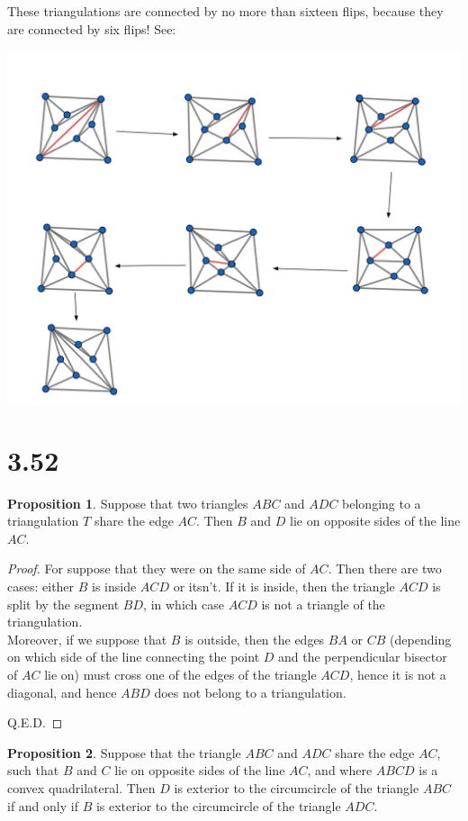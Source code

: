 \documentclass[12pt]{article}
\theoremstyle{definition}
\newtheorem{proposition}{Proposition}
\begin{document}
These triangulations are connected by no more than sixteen flips, because they are connected by six flips! See:

\includegraphics[scale=0.75]{flips.png} 


\section{3.52}


\begin{proposition}
Suppose that two triangles $ABC$ and $ADC$ belonging to a triangulation $T$ share the edge $AC$. Then $B$ and $D$ lie on opposite sides of the line $AC$. 
\end{proposition}

\begin{proof}
For suppose that they were on the same side of $AC$. Then there are two cases: either $B$ is inside $ACD$ or itsn't. If it is inside, then the triangle $ACD$ is split by the segment $BD$, in which case $ACD$ is not a triangle of the triangulation. \\

Moreover, if we suppose that $B$ is outside, then the edges $BA$ or $CB$ (depending on which side of the line connecting the point $D$ and the perpendicular bisector of $AC$ lie on) must cross one of the edges of the triangle $ACD$, hence it is not a diagonal, and hence $ABD$ does not belong to a triangulation.

Q.E.D.
\end{proof}

\begin{proposition}

Suppose that the triangle $ABC$ and $ADC$ share the edge $AC$, such that $B$ and $C$ lie on opposite sides of the line $AC$, and where $ABCD$ is a convex quadrilateral. Then $D$ is exterior to the circumcircle of the triangle $ABC$ if and only if $B$ is exterior to the circumcircle of the triangle $ADC$. 

\end{proposition}
\end{document}
